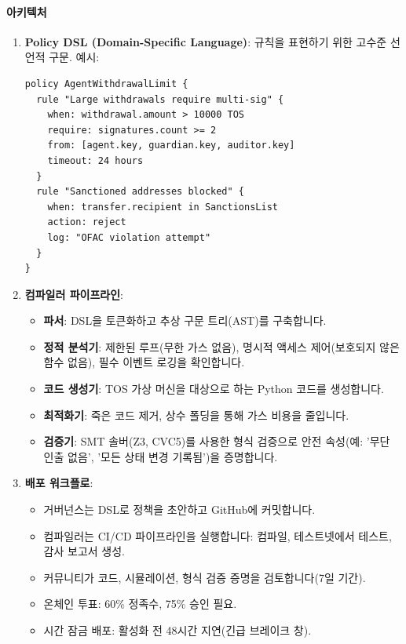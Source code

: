 \documentclass[11pt]{article}
\begin{document}
\paragraph{아키텍처}
\begin{enumerate}[noitemsep]
  \item \textbf{Policy DSL (Domain-Specific Language)}: 규칙을 표현하기 위한 고수준 선언적 구문. 예시:
  \begin{verbatim}
policy AgentWithdrawalLimit {
  rule "Large withdrawals require multi-sig" {
    when: withdrawal.amount > 10000 TOS
    require: signatures.count >= 2
    from: [agent.key, guardian.key, auditor.key]
    timeout: 24 hours
  }
  rule "Sanctioned addresses blocked" {
    when: transfer.recipient in SanctionsList
    action: reject
    log: "OFAC violation attempt"
  }
}
  \end{verbatim}
  \item \textbf{컴파일러 파이프라인}:
    \begin{itemize}[noitemsep]
      \item \textbf{파서}: DSL을 토큰화하고 추상 구문 트리(AST)를 구축합니다.
      \item \textbf{정적 분석기}: 제한된 루프(무한 가스 없음), 명시적 액세스 제어(보호되지 않은 함수 없음), 필수 이벤트 로깅을 확인합니다.
      \item \textbf{코드 생성기}: TOS 가상 머신을 대상으로 하는 Python 코드를 생성합니다.
      \item \textbf{최적화기}: 죽은 코드 제거, 상수 폴딩을 통해 가스 비용을 줄입니다.
      \item \textbf{검증기}: SMT 솔버(Z3, CVC5)를 사용한 형식 검증으로 안전 속성(예: '무단 인출 없음', '모든 상태 변경 기록됨')을 증명합니다.
    \end{itemize}
  \item \textbf{배포 워크플로}:
    \begin{itemize}[noitemsep]
      \item 거버넌스는 DSL로 정책을 초안하고 GitHub에 커밋합니다.
      \item 컴파일러는 CI/CD 파이프라인을 실행합니다: 컴파일, 테스트넷에서 테스트, 감사 보고서 생성.
      \item 커뮤니티가 코드, 시뮬레이션, 형식 검증 증명을 검토합니다(7일 기간).
      \item 온체인 투표: 60\% 정족수, 75\% 승인 필요.
      \item 시간 잠금 배포: 활성화 전 48시간 지연(긴급 브레이크 창).
    \end{itemize}
\end{enumerate}
\end{document}
